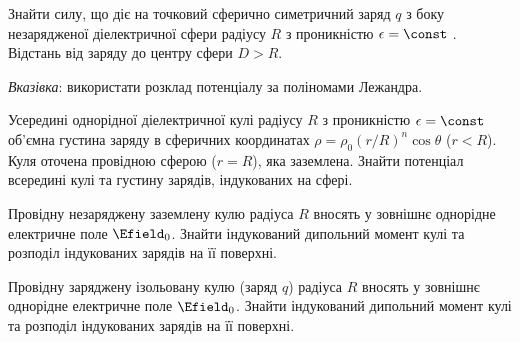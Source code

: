 \begin{problem}
Знайти силу, що діє на точковий сферично симетричний заряд  $q$ з боку незарядженої діелектричної
сфери радіусу $R$  з проникністю $\epsilon = \const$ . Відстань від заряду до центру сфери $D > R$.

\bigskip

\emph{Вказівка}: використати розклад потенціалу за поліномами Лежандра.
\end{problem}


\begin{problem}
    Усередині однорідної діелектричної кулі радіусу $R$ з проникністю $\epsilon=\const$  об'ємна
    густина заряду в сферичних координатах  $\rho = \rho_0(r/R)^n\cos\theta$ ($r<R$). Куля оточена
    провідною сферою ($r = R$), яка заземлена. Знайти потенціал всередині кулі та густину зарядів,
    індукованих на сфері.
\end{problem}

\begin{problem}
Провідну незаряджену заземлену кулю  радіуса $R$ вносять у зовнішнє однорідне електричне поле $\Efield_0$. Знайти індукований дипольний момент кулі  та розподіл індукованих зарядів на її поверхні.
\end{problem}

\begin{problem}
Провідну заряджену ізольовану кулю (заряд $q$) радіуса $R$ вносять у зовнішнє однорідне електричне поле $\Efield_0$. Знайти індукований дипольний момент кулі  та розподіл індукованих зарядів на її поверхні.
\end{problem}

